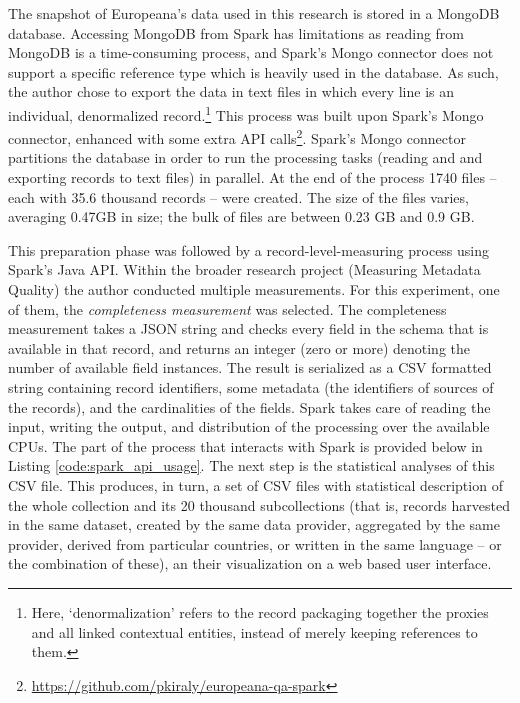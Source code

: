 The snapshot of Europeana’s data used in this research is stored in a MongoDB database. Accessing MongoDB from Spark has limitations as reading from MongoDB is a time-consuming process, and Spark's Mongo connector does not support a specific reference type which is heavily used in the database. As such, the author chose to export the data in text files in which every line is an individual, denormalized record.\footnote{Here, `denormalization' refers to the record packaging together the proxies and all linked contextual entities, instead of merely keeping references to them.} This process was built upon Spark's Mongo connector, enhanced with some extra API calls\footnote{\url{https://github.com/pkiraly/europeana-qa-spark}}. Spark's Mongo connector partitions the database in order to run the processing tasks (reading and and exporting records to text files) in parallel. At the end of the process 1740 files -- each with 35.6 thousand records -- were created. The size of the files varies, averaging 0.47GB in size; the bulk of files are between 0.23 GB and 0.9 GB.

This preparation phase was followed by a record-level-measuring process using Spark's Java API. Within the broader research project (Measuring Metadata Quality) the author conducted multiple measurements. For this experiment, one of them, the \emph{completeness measurement} was selected. The completeness measurement takes a JSON string and checks every field in the schema that is available in that record, and returns an integer (zero or more) denoting the number of available field instances. The result is serialized as a CSV formatted string containing record identifiers, some metadata (the identifiers of sources of the records), and the cardinalities of the fields. Spark takes care of reading the input, writing the output, and distribution of the processing over the available CPUs. The part of the process that interacts with Spark is provided below in Listing \ref{code:spark_api_usage}. The next step is the statistical analyses of this CSV file. This produces, in turn, a set of CSV files with statistical description of the whole collection and its 20 thousand subcollections (that is, records harvested in the same dataset, created by the same data provider, aggregated by the same provider, derived from particular countries, or written in the same language -- or the combination of these), an their visualization on a web based user interface.

